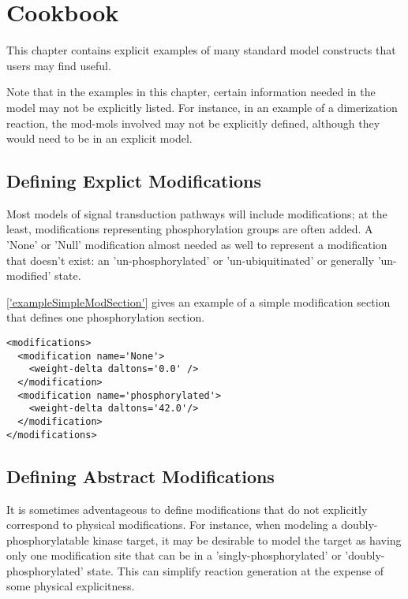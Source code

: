 \chapter{Cookbook}

This chapter contains explicit examples of many standard model
constructs that users may find useful.

Note that in the examples in this chapter, certain information needed
in the model may not be explicitly listed.  For instance, in an
example of a dimerization reaction, the mod-mols involved may not be
explicitly defined, although they would need to be in an explicit model.

\section{Defining Explict Modifications}

Most models of signal transduction pathways will include
modifications; at the least, modifications representing
phosphorylation groups are often added.  A 'None' or 'Null'
modification almost needed as well to represent a modification that
doesn't exist: an 'un-phosphorylated' or 'un-ubiquitinated' or
generally 'un-modified' state.

\ref{'exampleSimpleModSection'} gives an example of a simple
modification section that defines one phosphorylation section.

\begin{lstlisting}[caption='Example of a simple modification section', ref='exampleSimpleModSection']
<modifications>
  <modification name='None'>
    <weight-delta daltons='0.0' />
  </modification>
  <modification name='phosphorylated'>
    <weight-delta daltons='42.0'/>
  </modification>
</modifications>
\end{lstlisting}

\section{Defining Abstract Modifications}

It is sometimes adventageous to define modifications that do not
explicitly correspond to physical modifications. For instance, when
modeling a doubly-phosphorylatable kinase target, it may be desirable
to model the target as having only one modification site that can be
in a 'singly-phosphorylated' or 'doubly-phosphorylated' state.  This
can simplify reaction generation at the expense of some physical
explicitness.  

